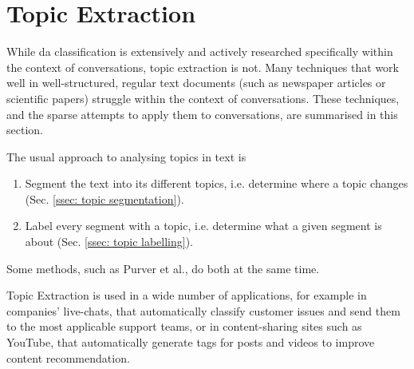 \section{Topic Extraction \label{sec: topic analysis}}

While \gls{da} classification is extensively and actively researched specifically within the context of conversations, topic extraction is not. Many techniques that work well in well-structured, regular text documents (such as newspaper articles or scientific papers) struggle within the context of conversations. These techniques, and the sparse attempts to apply them to conversations, are summarised in this section.

The usual approach to analysing topics in text is
\begin{enumerate}
    \item Segment the text into its different topics, i.e. determine where a topic changes (Sec. \ref{ssec: topic segmentation}).
    \item Label every segment with a topic, i.e. determine what a given segment is about (Sec. \ref{ssec: topic labelling}).
\end{enumerate}
Some methods, such as Purver et al.\cite{purver2006unsupervised}, do both at the same time.

Topic Extraction is used in a wide number of applications, for example in companies' live-chats, that automatically classify customer issues and send them to the most applicable support teams, or in content-sharing sites such as YouTube, that automatically generate tags for posts and videos to improve content recommendation\cite{queryClassification}.